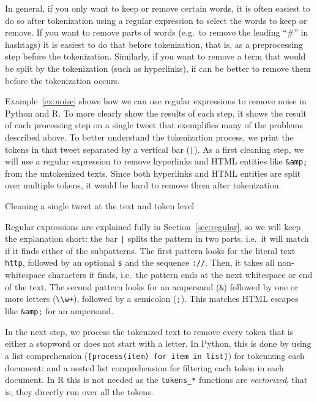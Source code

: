 In general, if you only want to keep or remove certain words, it is often easiest to do so after tokenization
using a regular expression to select the words to keep or remove.
If you want to remove parts of words (e.g.\ to remove the leading ``\#'' in hashtags) it is easiest to do that before tokenization,
that is, as a preprocessing step before the tokenization.
Similarly, if you want to remove a term that would be split by the tokenization (such as hyperlinks),
if can be better to remove them before the tokenization occurs.

Example~\ref{ex:noise} shows how we can use regular expressions to remove noise in Python and R.
To more clearly show the results of each step, it shows the result of each processing step on a single tweet that exemplifies many of the problems described above.
To better understand the tokenization process, we print the tokens in that tweet separated by a vertical bar (\verb+|+).
As a first cleaning step, we will use a regular expression to remove hyperlinks and HTML entities like \verb|&amp;| from the untokenized texts.
Since both hyperlinks and HTML entities are split over multiple tokens, it would be hard to remove them after tokenization.

\begin{ccsexample}
\caption{Cleaning a single tweet at the text and token level}\label{ex:noise}
\end{ccsexample}

Regular expressions are explained fully in Section~\ref{sec:regular}, so we will keep the explanation short:
the bar \verb+|+ splits the pattern in two parts, i.e.\ it will match if it finds either of the subpatterns.
The first pattern looks for the literal text \verb+http+, followed by an optional \verb+s+ and the sequence \verb+://+.
Then, it takes all non-whitespace characters it finds, i.e.\ the pattern ends at the next whitespace or end of the text.
The second pattern looks for an ampersand (\verb+&+) followed by one or more letters (\verb|\\w+|), followed by a semicolon (\verb+;+).
This matches HTML escapes like \verb+&amp;+ for an ampersand.

In the next step, we process the tokenized text to remove every token that is either a stopword or does not start with a letter.
In Python, this is done by using a list comprehension (\verb+[process(item) for item in list]+) for tokenizing each document; and a nested list comprehension for filtering each token in each document.
In R this is not needed as the \texttt{tokens\_*} functions are \emph{vectorized}, that is, they directly run over all the tokens.

